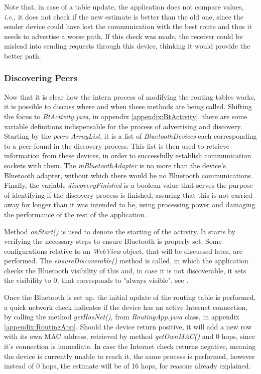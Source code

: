 Note that, in case of a table update, the application does not compare values, \textit{i.e.}, it does not check if the new estimate is better than the old one, since the sender device could have lost the communication with the best route and thus it needs to advertise a worse path. If this check was made, the receiver could be mislead into sending requests through this device, thinking it would provide the better path.

\subsubsection{Discovering Peers}
\label{subsubsec:disc}

Now that it is clear how the intern process of modifying the routing tables works, it is possible to discuss where and when these methods are being called. Shifting the focus to \textit{BtActivity.java}, in appendix \ref{appendix:BtActivity}, there are some variable definitions indispensable for the process of advertising and discovery. Starting by the \textit{peers} \textit{ArrayList}, it is a list of \textit{BluetoothDevices} each corresponding to a peer found in the discovery process. This list is then used to retrieve information from these devices, in order to successfully establish communication sockets with them. The \textit{mBluetoothAdapter} is no more than the device's Bluetooth adapter, without which there would be no Bluetooth communications. Finally, the variable \textit{discoveryFinished} is a boolean value that serves the purpose of identifying if the discovery process is finished, assuring that this is not carried away for longer than it was intended to be, using processing power and damaging the performance of the rest of the application.

Method \textit{onStart()} is used to denote the starting of the activity. It  starts by verifying the necessary steps to ensure Bluetooth is properly set. Some configurations relative to an \textit{WebView} object, that will be discussed later, are performed. The \textit{ensureDiscoverable()} method is called, in which the application checks the Bluetooth visibility of this and, in case it is not discoverable, it sets the visibility to 0, that corresponds to "always visible", see \cite{btandroid}.

Once the Bluetooth is set up, the initial update of the routing table is performed, a quick network check indicates if the device has an active Internet connection, by calling the method \textit{getHasNet()}, from \textit{RoutingApp.java} class, in appendix \ref{appendix:RoutingApp}. Should the device return positive, it will add a new row with its own \gls{MAC} address, retrieved by method \textit{getOwnMAC()} and 0 hops, since it's connection is immediate. In case the Internet check returns negative, meaning the device is currently unable to reach it, the same process is performed, however instead of 0 hops, the estimate will be of 16 hops, for reasons already explained.

